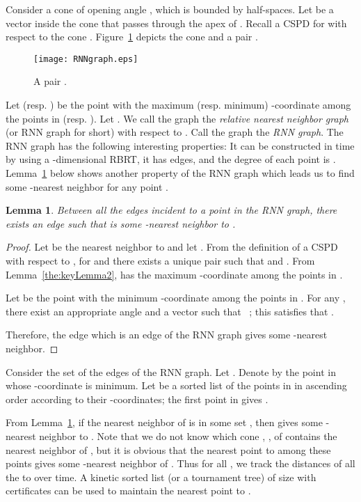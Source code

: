 \documentclass[preprint,12pt]{elsarticle}
\newtheorem{lemma}{Lemma}[section]
\begin{document}
Consider a cone  of opening angle , which is bounded by  half-spaces. Let  be a vector inside the cone  that passes through the apex of . Recall a CSPD  for  with respect to the cone . Figure~\ref{fig:RNNgraph} depicts the cone  and a pair . 

\begin{figure}[h]
  \begin{center}
    \texttt{[image: RNNgraph.eps]}
  \end{center}
  \caption{A pair .}
  \label{fig:RNNgraph}
\end{figure}

Let  (resp. ) be the point with the maximum (resp. minimum) -coordinate among the points in  (resp. ). Let . We call the graph  the \textit{relative nearest neighbor graph} (or RNN graph for short) with respect to . Call the graph  the \textit{RNN graph}.  The RNN graph has the following interesting properties:  It can be constructed in  time by using a -dimensional RBRT,  it has  edges, and  the degree of each point is . Lemma~\ref{the:RNNGlemma} below shows another property of the RNN graph which leads us to find some -nearest neighbor for any point . 

\begin{lemma}\label{the:RNNGlemma}
Between all the edges incident to a point  in the RNN graph, there exists an edge  such that  is some -nearest neighbor to .
\end{lemma}
\begin{proof}
Let  be the nearest neighbor to  and let . From the definition of a CSPD with respect to , for  and  there exists a unique pair  such that  and . From Lemma~\ref{the:keyLemma2},  has the maximum -coordinate among the points in . 

Let  be the point with the minimum -coordinate among the points in . For any , there exist an appropriate angle  and a vector  such that ~\cite{Abam:2011:KSX:1971362.1971367}; this satisfies that . 

Therefore, the edge  which is an edge of the RNN graph gives some -nearest neighbor.
\end{proof}


Consider the set  of the edges of the RNN graph. Let . Denote by  the point in  whose -coordinate is minimum. Let  be a sorted list of the points in  in ascending order according to their -coordinates; the first point in  gives . 

From Lemma~\ref{the:RNNGlemma}, if the nearest neighbor of  is in some set , then  gives some -nearest neighbor to . Note that we do not know which cone , , of  contains the nearest neighbor of , but it is obvious that the nearest point to  among these  points  gives some -nearest neighbor of . Thus for all , we track the distances of all the  to  over time. A kinetic sorted list (or a tournament tree)  of size  with  certificates can be used to maintain the nearest point to . 
\end{document}
